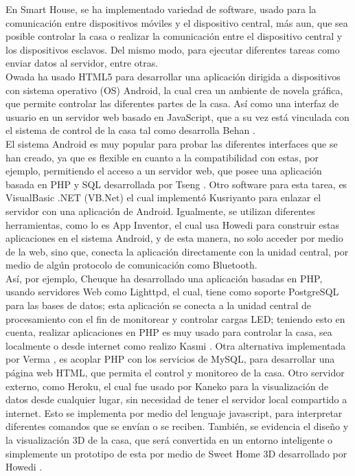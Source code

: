 En Smart House, se ha implementado variedad de software, usado para la comunicación entre dispositivos móviles y el dispositivo central, más aun, que sea posible controlar la casa o realizar la comunicación entre el dispositivo central y los dispositivos esclavos. Del mismo modo, para ejecutar diferentes tareas como enviar datos al servidor, entre otras.\\

Owada \cite{Owada2012} ha usado HTML5 para desarrollar una aplicación dirigida a dispositivos con sistema operativo (OS) Android, la cual crea un ambiente de novela gráfica, que permite controlar las diferentes partes de la casa. Así como una interfaz de usuario en un servidor web basado en JavaScript, que a su vez está vinculada con el sistema de control de la casa tal como desarrolla Behan \cite{Behan2013}.\\

El sistema Android es muy popular para probar las diferentes interfaces que se han creado, ya que es flexible en cuanto a la compatibilidad con estas, por ejemplo, permitiendo el acceso a un servidor web, que posee una aplicación basada en PHP y SQL desarrollada por Tseng \cite{Tseng2014}. Otro software para esta tarea, es VisualBasic .NET (VB.Net) el cual implementó Kusriyanto \cite{Kusriyanto2015} para enlazar el servidor con una aplicación de Android. Igualmente, se utilizan diferentes herramientas, como lo es App Inventor, el cual usa Howedi \cite{Howedi2016} para construir estas aplicaciones en el sistema Android, y de esta manera, no solo acceder por medio de la web, sino que, conecta la aplicación directamente con la unidad central, por medio de algún protocolo de comunicación  como Bluetooth. \\

Así, por ejemplo, Cheuque \cite{Cheuque2015} ha desarrollado una aplicación basadas en PHP, usando servidores Web como Lighttpd, el cual, tiene como soporte PostgreSQL para las bases de datos; esta aplicación se conecta a la unidad central de procesamiento con el fin de monitorear y controlar cargas LED; teniendo esto en cuenta, realizar aplicaciones en PHP es muy usado para controlar la casa, sea localmente o desde internet como realizo Kasmi \cite{Kasmi2016}. Otra alternativa implementada por Verma \cite{Verma2016}, es acoplar PHP con los servicios de MySQL, para desarrollar una página web HTML, que permita el control y monitoreo de la casa. Otro servidor externo, como Heroku, el cual fue usado por Kaneko \cite{Kaneko2017} para la visualización de datos desde cualquier lugar, sin necesidad de tener el servidor local compartido a internet. Esto se implementa por medio del lenguaje javascript, para interpretar diferentes comandos que se envían o se reciben. También, se evidencia el diseño y la visualización 3D de la casa, que será convertida en un entorno inteligente o simplemente un prototipo de esta por medio de Sweet Home 3D desarrollado por Howedi \cite{Howedi2016}.\\

